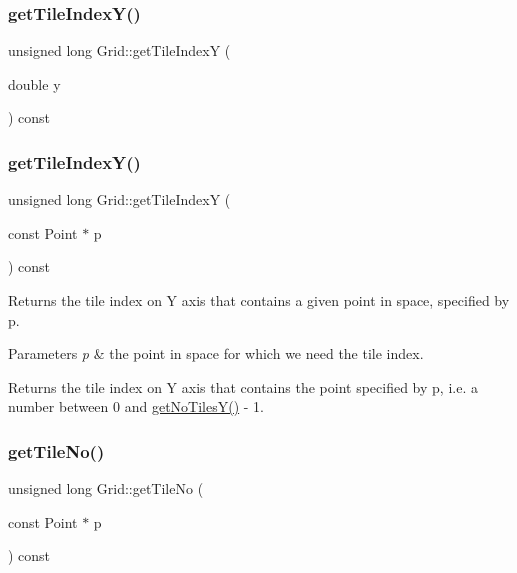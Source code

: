 \subsubsection{\texorpdfstring{get\+Tile\+Index\+Y()}{getTileIndexY()}\hspace{0.1cm}{\footnotesize\ttfamily [1/2]}}
{\footnotesize\ttfamily unsigned long Grid\+::get\+Tile\+IndexY (\begin{DoxyParamCaption}\item[{double}]{y }\end{DoxyParamCaption}) const\hspace{0.3cm}{\ttfamily [private]}}

\mbox{\label{class_grid_ae1eeb3b42007ae1cf19cfaf0d846fb9a}} 
\subsubsection{\texorpdfstring{get\+Tile\+Index\+Y()}{getTileIndexY()}\hspace{0.1cm}{\footnotesize\ttfamily [2/2]}}
{\footnotesize\ttfamily unsigned long Grid\+::get\+Tile\+IndexY (\begin{DoxyParamCaption}\item[{const Point $\ast$}]{p }\end{DoxyParamCaption}) const\hspace{0.3cm}{\ttfamily [private]}}

Returns the tile index on Y axis that contains a given point in space, specified by p. 
\begin{DoxyParams}{Parameters}
{\em p} & the point in space for which we need the tile index. \\
\hline
\end{DoxyParams}
\begin{DoxyReturn}{Returns}
the tile index on Y axis that contains the point specified by p, i.\+e. a number between 0 and \hyperlink{class_grid_a783a3153d03154cfd33e6a418bb8d390}{get\+No\+Tiles\+Y()} -\/ 1. 
\end{DoxyReturn}
\mbox{\label{class_grid_a93e42713b7af1f188ce90f92a5e202ab}} 
\subsubsection{\texorpdfstring{get\+Tile\+No()}{getTileNo()}\hspace{0.1cm}{\footnotesize\ttfamily [1/2]}}
{\footnotesize\ttfamily unsigned long Grid\+::get\+Tile\+No (\begin{DoxyParamCaption}\item[{const Point $\ast$}]{p }\end{DoxyParamCaption}) const}

